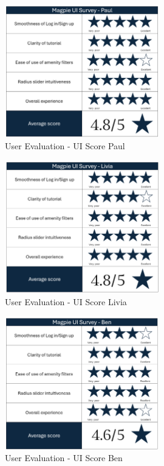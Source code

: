 \begin{figure}[htbp]
    \centering
    \includegraphics[width=0.6\textwidth]{images/survey-paul.png}
    \caption{User Evaluation - UI Score Paul}
    \label{fig:paulscore}
\end{figure}

\begin{figure}[htbp]
    \centering
    \includegraphics[width=0.6\textwidth]{images/survey-livia.png}
    \caption{User Evaluation - UI Score Livia}
    \label{fig:liviascore}
\end{figure}

\begin{figure}[htbp]
    \centering
    \includegraphics[width=0.6\textwidth]{images/survey-ben.png}
    \caption{User Evaluation - UI Score Ben}
    \label{fig:benscore}
\end{figure}

